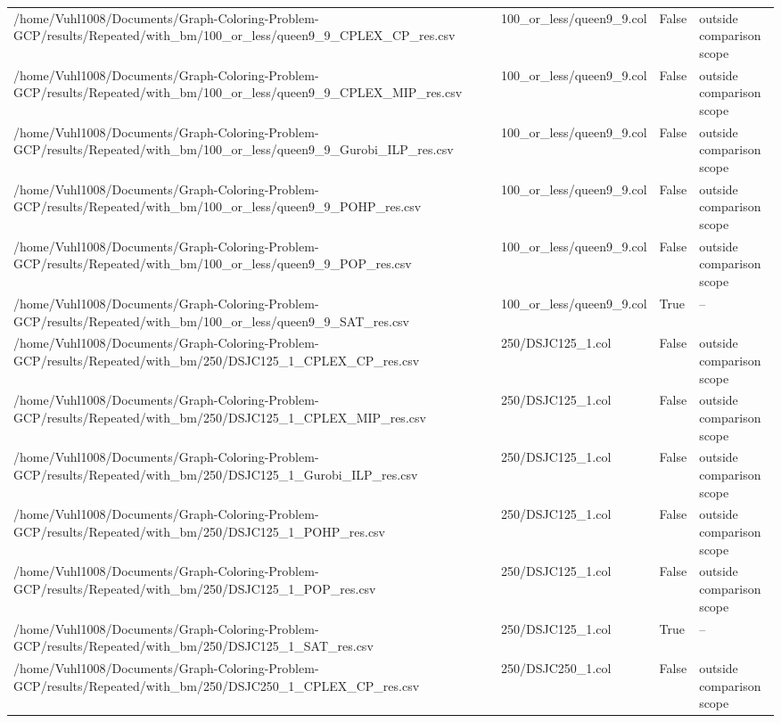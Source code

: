 \begin{table}[htbp]
\begin{tabular}{llll}
/home/Vuhl1008/Documents/Graph-Coloring-Problem-GCP/results/Repeated/with\_bm/100\_or\_less/queen9\_9\_CPLEX\_CP\_res.csv & 100\_or\_less/queen9\_9.col & False & outside comparison scope \\
/home/Vuhl1008/Documents/Graph-Coloring-Problem-GCP/results/Repeated/with\_bm/100\_or\_less/queen9\_9\_CPLEX\_MIP\_res.csv & 100\_or\_less/queen9\_9.col & False & outside comparison scope \\
/home/Vuhl1008/Documents/Graph-Coloring-Problem-GCP/results/Repeated/with\_bm/100\_or\_less/queen9\_9\_Gurobi\_ILP\_res.csv & 100\_or\_less/queen9\_9.col & False & outside comparison scope \\
/home/Vuhl1008/Documents/Graph-Coloring-Problem-GCP/results/Repeated/with\_bm/100\_or\_less/queen9\_9\_POHP\_res.csv & 100\_or\_less/queen9\_9.col & False & outside comparison scope \\
/home/Vuhl1008/Documents/Graph-Coloring-Problem-GCP/results/Repeated/with\_bm/100\_or\_less/queen9\_9\_POP\_res.csv & 100\_or\_less/queen9\_9.col & False & outside comparison scope \\
/home/Vuhl1008/Documents/Graph-Coloring-Problem-GCP/results/Repeated/with\_bm/100\_or\_less/queen9\_9\_SAT\_res.csv & 100\_or\_less/queen9\_9.col & True & -- \\
/home/Vuhl1008/Documents/Graph-Coloring-Problem-GCP/results/Repeated/with\_bm/250/DSJC125\_1\_CPLEX\_CP\_res.csv & 250/DSJC125\_1.col & False & outside comparison scope \\
/home/Vuhl1008/Documents/Graph-Coloring-Problem-GCP/results/Repeated/with\_bm/250/DSJC125\_1\_CPLEX\_MIP\_res.csv & 250/DSJC125\_1.col & False & outside comparison scope \\
/home/Vuhl1008/Documents/Graph-Coloring-Problem-GCP/results/Repeated/with\_bm/250/DSJC125\_1\_Gurobi\_ILP\_res.csv & 250/DSJC125\_1.col & False & outside comparison scope \\
/home/Vuhl1008/Documents/Graph-Coloring-Problem-GCP/results/Repeated/with\_bm/250/DSJC125\_1\_POHP\_res.csv & 250/DSJC125\_1.col & False & outside comparison scope \\
/home/Vuhl1008/Documents/Graph-Coloring-Problem-GCP/results/Repeated/with\_bm/250/DSJC125\_1\_POP\_res.csv & 250/DSJC125\_1.col & False & outside comparison scope \\
/home/Vuhl1008/Documents/Graph-Coloring-Problem-GCP/results/Repeated/with\_bm/250/DSJC125\_1\_SAT\_res.csv & 250/DSJC125\_1.col & True & -- \\
/home/Vuhl1008/Documents/Graph-Coloring-Problem-GCP/results/Repeated/with\_bm/250/DSJC250\_1\_CPLEX\_CP\_res.csv & 250/DSJC250\_1.col & False & outside comparison scope \\

\end{tabular}
\end{table}
